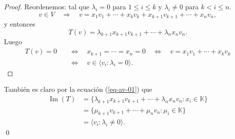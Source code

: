 \documentclass[handout]{beamer} %
\newcommand{\img}{\operatorname{Im}}
\newcommand{\nuc}{\operatorname{Nu}}
\newcommand{\K}{\mathbb K}
\begin{document}
\begin{frame}
    \pause
    \begin{proof}\pause Reordenemos:  tal que  $\lambda_i =0$ para $1 \le i \le k$ y $\lambda_i \ne 0$ para $k < i \le n$. 
    $$
    v \in V \quad \Rightarrow \quad v = x_1v_1 + \cdots+ x_k v_k+ x_{k+1} v_{k+1}+\cdots+ x_n v_n,
    $$
    y entonces
    \begin{equation}\label{eq-av-01}
        T(v) =  \lambda_{k+1}x_{k+1} v_{k+1}+\cdots+ \lambda_nx_n v_n.
    \end{equation}
    Luego 
    \begin{align*}
        T(v) =0 \quad &\Leftrightarrow \quad x_{k+1} = \cdots = x_n=0  \quad \Leftrightarrow \quad v =  x_1v_1 + \cdots+ x_k v_k \\
        \quad &\Leftrightarrow \quad v \in \langle v_i: \lambda_i =0 \rangle. 
    \end{align*}
    
    \end{proof}
\end{frame}



\begin{frame}
    
    También es claro por la ecuación (\ref{eq-av-01}) que 
    \begin{align*}
        \img(T) &= \{\lambda_{k+1}x_{k+1} v_{k+1}+\cdots+ \lambda_nx_n v_n: x_i \in \K \} \\
        &=\{\mu_{k+1} v_{k+1}+\cdots+ \mu_n v_n: \mu_i \in \K \}\\
        &= \langle v_i: \lambda_i \not=0 \rangle.
    \end{align*}
    \qed
    \vskip 3cm
\end{frame}
\end{document}
